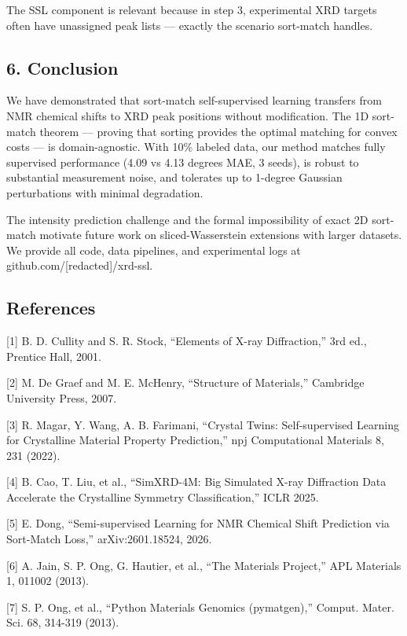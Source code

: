 \documentclass[
  11pt,
]{article}
\begin{document}
The SSL component is relevant because in step 3, experimental XRD
targets often have unassigned peak lists --- exactly the scenario
sort-match handles.

\subsection{6. Conclusion}\label{conclusion}

We have demonstrated that sort-match self-supervised learning transfers
from NMR chemical shifts to XRD peak positions without modification. The
1D sort-match theorem --- proving that sorting provides the optimal
matching for convex costs --- is domain-agnostic. With 10\% labeled
data, our method matches fully supervised performance (4.09 vs 4.13
degrees MAE, 3 seeds), is robust to substantial measurement noise, and
tolerates up to 1-degree Gaussian perturbations with minimal
degradation.

The intensity prediction challenge and the formal impossibility of exact
2D sort-match motivate future work on sliced-Wasserstein extensions with
larger datasets. We provide all code, data pipelines, and experimental
logs at github.com/{[}redacted{]}/xrd-ssl.

\subsection{References}\label{references}

{[}1{]} B. D. Cullity and S. R. Stock, ``Elements of X-ray
Diffraction,'' 3rd ed., Prentice Hall, 2001.

{[}2{]} M. De Graef and M. E. McHenry, ``Structure of Materials,''
Cambridge University Press, 2007.

{[}3{]} R. Magar, Y. Wang, A. B. Farimani, ``Crystal Twins:
Self-supervised Learning for Crystalline Material Property Prediction,''
npj Computational Materials 8, 231 (2022).

{[}4{]} B. Cao, T. Liu, et al., ``SimXRD-4M: Big Simulated X-ray
Diffraction Data Accelerate the Crystalline Symmetry Classification,''
ICLR 2025.

{[}5{]} E. Dong, ``Semi-supervised Learning for NMR Chemical Shift
Prediction via Sort-Match Loss,'' arXiv:2601.18524, 2026.

{[}6{]} A. Jain, S. P. Ong, G. Hautier, et al., ``The Materials
Project,'' APL Materials 1, 011002 (2013).

{[}7{]} S. P. Ong, et al., ``Python Materials Genomics (pymatgen),''
Comput. Mater. Sci. 68, 314-319 (2013).
\end{document}
